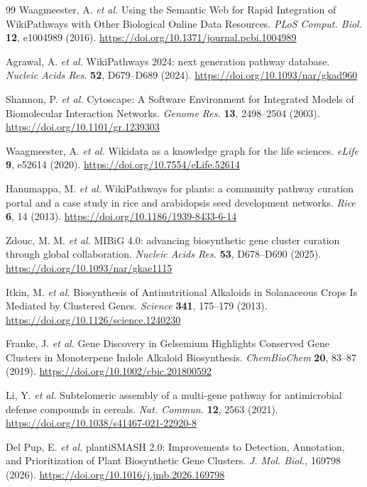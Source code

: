 \documentclass[11pt,a4paper]{article}
\begin{document}
\begin{thebibliography}{99}
Waagmeester, A. \textit{et al.} Using the Semantic Web for Rapid Integration of WikiPathways with Other Biological Online Data Resources. \textit{PLoS Comput. Biol.} \textbf{12}, e1004989 (2016). \url{https://doi.org/10.1371/journal.pcbi.1004989}

Agrawal, A. \textit{et al.} WikiPathways 2024: next generation pathway database. \textit{Nucleic Acids Res.} \textbf{52}, D679--D689 (2024). \url{https://doi.org/10.1093/nar/gkad960}

Shannon, P. \textit{et al.} Cytoscape: A Software Environment for Integrated Models of Biomolecular Interaction Networks. \textit{Genome Res.} \textbf{13}, 2498--2504 (2003). \url{https://doi.org/10.1101/gr.1239303}

Waagmeester, A. \textit{et al.} Wikidata as a knowledge graph for the life sciences. \textit{eLife} \textbf{9}, e52614 (2020). \url{https://doi.org/10.7554/eLife.52614}

Hanumappa, M. \textit{et al.} WikiPathways for plants: a community pathway curation portal and a case study in rice and arabidopsis seed development networks. \textit{Rice} \textbf{6}, 14 (2013). \url{https://doi.org/10.1186/1939-8433-6-14}

Zdouc, M. M. \textit{et al.} MIBiG 4.0: advancing biosynthetic gene cluster curation through global collaboration. \textit{Nucleic Acids Res.} \textbf{53}, D678--D690 (2025). \url{https://doi.org/10.1093/nar/gkae1115}

Itkin, M. \textit{et al.} Biosynthesis of Antinutritional Alkaloids in Solanaceous Crops Is Mediated by Clustered Genes. \textit{Science} \textbf{341}, 175--179 (2013). \url{https://doi.org/10.1126/science.1240230}

Franke, J. \textit{et al.} Gene Discovery in Gelsemium Highlights Conserved Gene Clusters in Monoterpene Indole Alkaloid Biosynthesis. \textit{ChemBioChem} \textbf{20}, 83--87 (2019). \url{https://doi.org/10.1002/cbic.201800592}

Li, Y. \textit{et al.} Subtelomeric assembly of a multi-gene pathway for antimicrobial defense compounds in cereals. \textit{Nat. Commun.} \textbf{12}, 2563 (2021). \url{https://doi.org/10.1038/s41467-021-22920-8}

Del Pup, E. \textit{et al.} plantiSMASH 2.0: Improvements to Detection, Annotation, and Prioritization of Plant Biosynthetic Gene Clusters. \textit{J. Mol. Biol.}, 169798 (2026). \url{https://doi.org/10.1016/j.jmb.2026.169798}


\end{thebibliography}
\end{document}
